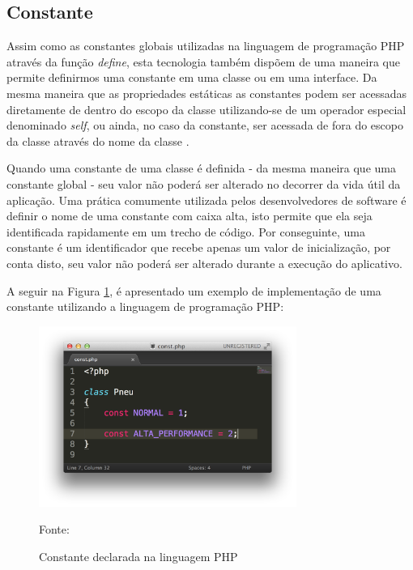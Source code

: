 \subsection{Constante}

Assim como as constantes globais utilizadas na linguagem de programação
\acs{PHP} através da função \textit{define}, esta tecnologia também dispõem de
uma maneira que permite definirmos uma constante em uma classe ou em uma 
interface. Da mesma maneira que as propriedades estáticas as constantes podem 
ser acessadas diretamente de dentro do escopo da classe utilizando-se de um 
operador especial denominado \textit{self}, ou ainda, no caso da constante, ser
acessada de fora do escopo da classe através do nome da classe \cite{programmingPhp}.

Quando uma constante de uma classe é definida - da mesma maneira que uma
constante global -  seu valor não poderá ser alterado no decorrer da vida útil
da aplicação. Uma prática comumente utilizada pelos desenvolvedores de software
é definir o nome de uma constante com caixa alta, isto permite que ela seja
identificada rapidamente em um trecho de código. Por conseguinte, uma constante
é um identificador que recebe apenas um valor de inicialização, por conta disto,
seu valor não poderá ser alterado durante a execução do aplicativo.

A seguir na Figura \ref{fig:constante}, é apresentado um exemplo de implementação
de uma constante utilizando a linguagem de programação \acs{PHP}:

\begin{figure}[h!tb]
	\caption{Constante declarada na linguagem PHP}
	\label{fig:constante}

	\centering
	\includegraphics[width=0.75\textwidth]{images/const.png}

	\centering
	\footnotesize Fonte: \fonteOAutor
\end{figure}

